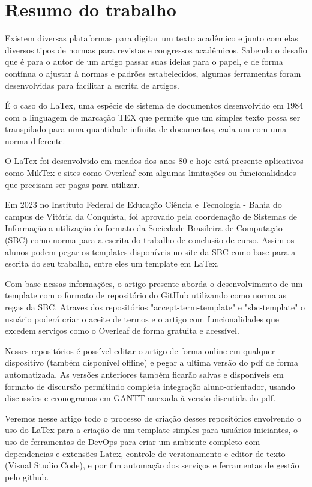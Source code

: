 \section{Resumo do trabalho}

Existem diversas plataformas para digitar um texto acadêmico e junto com elas diversos tipos de normas para revistas e congressos acadêmicos. Sabendo o desafio que é para o autor de um artigo passar suas ideias para o papel, e de forma contínua o ajustar à normas e padrões estabelecidos, algumas ferramentas foram desenvolvidas para facilitar a escrita de artigos.

É o caso do LaTex, uma espécie de sistema de documentos desenvolvido em 1984 com a linguagem de marcação TEX que permite que um simples texto possa ser transpilado para uma quantidade infinita de documentos, cada um com uma norma diferente.

O LaTex foi desenvolvido em meados dos anos 80 e hoje está presente aplicativos como MikTex e sites como Overleaf com algumas limitações ou funcionalidades que precisam ser pagas para utilizar.

Em 2023 no Instituto Federal de Educação Ciência e Tecnologia - Bahia do campus de Vitória da Conquista, foi aprovado pela coordenação de Sistemas de Informação a utilização do formato da Sociedade Brasileira de Computação (SBC) como norma para a escrita do trabalho de conclusão de curso. Assim os alunos podem pegar os templates disponíveis no site da SBC como base para a escrita do seu trabalho, entre eles um template em LaTex.

Com base nessas informações, o artigo presente aborda o desenvolvimento de um template com o formato de repositório do GitHub utilizando como norma as regas da SBC. Atraves dos repositórios "accept-term-template" e "sbc-template" o usuário poderá criar o aceite de termos e o artigo com funcionalidades que excedem serviços como o Overleaf de forma gratuita e acessível.

Nesses repositórios é possível editar o artigo de forma online em qualquer dispositivo (também disponível offline) e pegar a ultima versão do pdf de forma automatizada. As versões anteriores também ficarão salvas e disponíveis em formato de discursão permitindo completa integração aluno-orientador, usando discussões e cronogramas em GANTT anexada à versão discutida do pdf.

Veremos nesse artigo todo o processo de criação desses repositórios envolvendo o uso do LaTex para a criação de um template simples para usuários iniciantes, o uso de ferramentas de DevOps para criar um ambiente completo com dependencias e extensões Latex, controle de versionamento e editor de texto (Visual Studio Code), e por fim automação dos serviços e ferramentas de gestão pelo github.